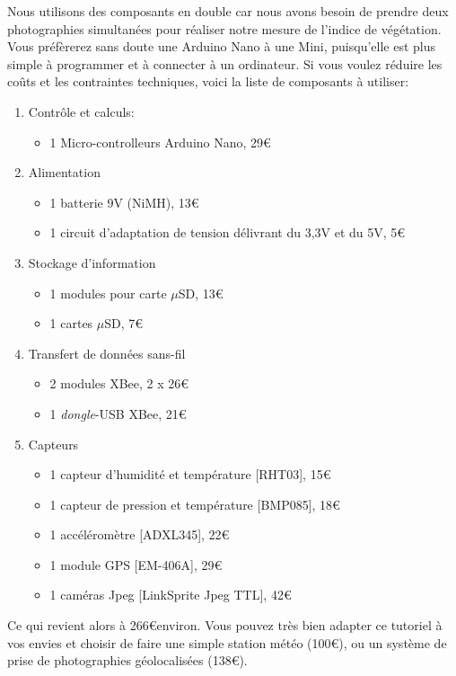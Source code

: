 \documentclass[twocolumn, 8pt]{article}
\begin{document}
\par Nous utilisons des composants en double car nous avons besoin de prendre deux photographies simultanées pour réaliser notre mesure de l'indice de végétation. Vous préfèrerez sans doute une Arduino Nano à une Mini, puisqu'elle est plus simple à programmer et à connecter à un ordinateur. Si vous voulez réduire les coûts et les contraintes techniques, voici la liste de composants à utiliser:
\begin{enumerate}
	\item Contrôle et calculs:
		\begin{itemize}
			\item 1 Micro-controlleurs Arduino Nano, 29\euro
		\end{itemize}
	\item Alimentation
		\begin{itemize}
			\item 1 batterie 9V (NiMH), 13\euro
			\item 1 circuit d'adaptation de tension délivrant du 3,3V et du 5V, 5\euro
		\end{itemize}
	\item Stockage d'information
		\begin{itemize}
			\item 1 modules pour carte $\mu$SD, 13\euro
			\item 1 cartes $\mu$SD, 7\euro
		\end{itemize}
	\item Transfert de données sans-fil
		\begin{itemize}
			\item 2 modules XBee, 2 x 26\euro 
			\item 1 \textit{dongle}-USB XBee, 21\euro
		\end{itemize}
	\item Capteurs
		\begin{itemize}
			\item 1 capteur d'humidité et température [RHT03], 15\euro
			\item 1 capteur de pression et température [BMP085], 18\euro
			\item 1 accéléromètre [ADXL345], 22\euro
			\item 1 module GPS [EM-406A], 29\euro 
			\item 1 caméras Jpeg [LinkSprite Jpeg TTL], 42\euro
		\end{itemize}
\end{enumerate}
Ce qui revient alors à 266\euro environ. Vous pouvez très bien adapter ce tutoriel à vos envies et choisir de faire une simple station météo (100\euro), ou un système de prise de photographies géolocalisées (138\euro).
\end{document}
